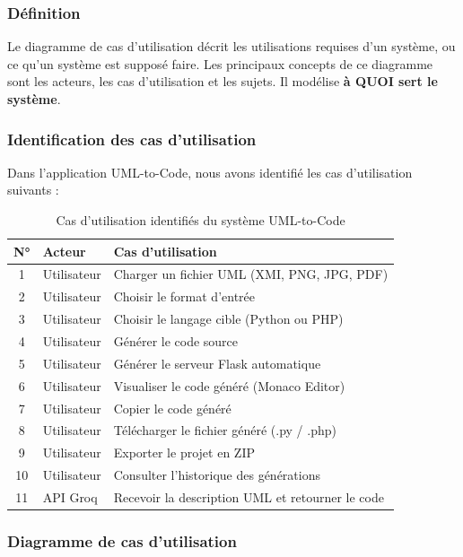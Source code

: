 \subsubsection{Définition}

Le diagramme de cas d'utilisation décrit les utilisations requises d'un système, ou ce qu'un système est supposé faire. Les principaux concepts de ce diagramme sont les acteurs, les cas d'utilisation et les sujets. Il modélise \textbf{à QUOI sert le système}.

\subsubsection{Identification des cas d'utilisation}

Dans l'application UML-to-Code, nous avons identifié les cas d'utilisation suivants :

\begin{table}[htbp]
\centering
\renewcommand{\arraystretch}{1.4}
\begin{tabular}{|c|l|p{7cm}|}
\hline
\rowcolor{gray!30}
\textbf{N°} & \textbf{Acteur} & \textbf{Cas d'utilisation} \\
\hline
1 & Utilisateur & Charger un fichier UML (XMI, PNG, JPG, PDF) \\
\hline
2 & Utilisateur & Choisir le format d'entrée \\
\hline
3 & Utilisateur & Choisir le langage cible (Python ou PHP) \\
\hline
4 & Utilisateur & Générer le code source \\
\hline
5 & Utilisateur & Générer le serveur Flask automatique \\
\hline
6 & Utilisateur & Visualiser le code généré (Monaco Editor) \\
\hline
7 & Utilisateur & Copier le code généré \\
\hline
8 & Utilisateur & Télécharger le fichier généré (.py / .php) \\
\hline
9 & Utilisateur & Exporter le projet en ZIP \\
\hline
10 & Utilisateur & Consulter l'historique des générations \\
\hline
11 & API Groq & Recevoir la description UML et retourner le code \\
\hline
\end{tabular}
\caption{Cas d'utilisation identifiés du système UML-to-Code}
\end{table}

\subsubsection{Diagramme de cas d'utilisation}

